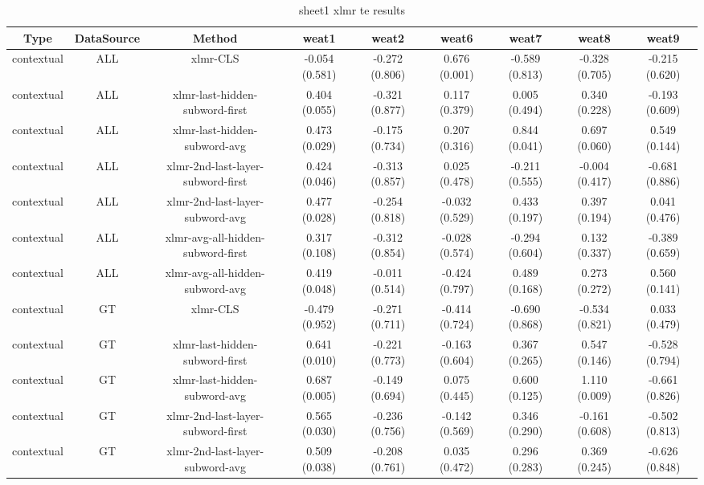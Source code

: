 \begin{sidewaystable}[htb]
    \centering
    \caption{sheet1 xlmr te results}
    \label{appendix_tab:sheet1_xlmr_te_results}
    \small
    \begin{tabular}{@{}ccccccccc@{}}
        \toprule
        Type & DataSource & Method & weat1 & weat2 & weat6 & weat7 & weat8 & weat9 \\
        \midrule
        contextual & ALL & xlmr-CLS & -0.054 (0.581) & -0.272 (0.806) & 0.676 (0.001) & -0.589 (0.813) & -0.328 (0.705) & -0.215 (0.620) \\
        contextual & ALL & xlmr-last-hidden-subword-first & 0.404 (0.055) & -0.321 (0.877) & 0.117 (0.379) & 0.005 (0.494) & 0.340 (0.228) & -0.193 (0.609) \\
        contextual & ALL & xlmr-last-hidden-subword-avg & 0.473 (0.029) & -0.175 (0.734) & 0.207 (0.316) & 0.844 (0.041) & 0.697 (0.060) & 0.549 (0.144) \\
        contextual & ALL & xlmr-2nd-last-layer-subword-first & 0.424 (0.046) & -0.313 (0.857) & 0.025 (0.478) & -0.211 (0.555) & -0.004 (0.417) & -0.681 (0.886) \\
        contextual & ALL & xlmr-2nd-last-layer-subword-avg & 0.477 (0.028) & -0.254 (0.818) & -0.032 (0.529) & 0.433 (0.197) & 0.397 (0.194) & 0.041 (0.476) \\
        contextual & ALL & xlmr-avg-all-hidden-subword-first & 0.317 (0.108) & -0.312 (0.854) & -0.028 (0.574) & -0.294 (0.604) & 0.132 (0.337) & -0.389 (0.659) \\
        contextual & ALL & xlmr-avg-all-hidden-subword-avg & 0.419 (0.048) & -0.011 (0.514) & -0.424 (0.797) & 0.489 (0.168) & 0.273 (0.272) & 0.560 (0.141) \\
        contextual & GT & xlmr-CLS & -0.479 (0.952) & -0.271 (0.711) & -0.414 (0.724) & -0.690 (0.868) & -0.534 (0.821) & 0.033 (0.479) \\
        contextual & GT & xlmr-last-hidden-subword-first & 0.641 (0.010) & -0.221 (0.773) & -0.163 (0.604) & 0.367 (0.265) & 0.547 (0.146) & -0.528 (0.794) \\
        contextual & GT & xlmr-last-hidden-subword-avg & 0.687 (0.005) & -0.149 (0.694) & 0.075 (0.445) & 0.600 (0.125) & 1.110 (0.009) & -0.661 (0.826) \\
        contextual & GT & xlmr-2nd-last-layer-subword-first & 0.565 (0.030) & -0.236 (0.756) & -0.142 (0.569) & 0.346 (0.290) & -0.161 (0.608) & -0.502 (0.813) \\
        contextual & GT & xlmr-2nd-last-layer-subword-avg & 0.509 (0.038) & -0.208 (0.761) & 0.035 (0.472) & 0.296 (0.283) & 0.369 (0.245) & -0.626 (0.848) \\

\end{tabular}
\end{sidewaystable}
